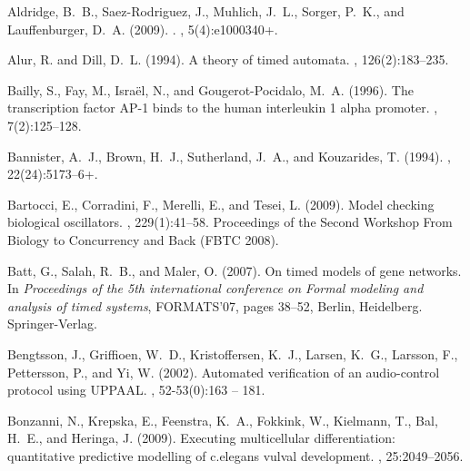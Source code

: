 \documentclass{bioinfo}
\begin{document}
% 
% 
\begin{thebibliography}{}

Aldridge, B.~B., Saez-Rodriguez, J., Muhlich, J.~L., Sorger, P.~K., and
  Lauffenburger, D.~A. (2009).
.
, 5(4):e1000340+.

Alur, R. and Dill, D.~L. (1994).
\newblock A theory of timed automata.
, 126(2):183--235.

Bailly, S., Fay, M., Isra{\"{e}}l, N., and Gougerot-Pocidalo, M.~A. (1996).
\newblock The transcription factor {AP-1} binds to the human interleukin 1
  alpha promoter.
, 7(2):125--128.

Bannister, A.~J., Brown, H.~J., Sutherland, J.~A., and Kouzarides, T. (1994).
, 22(24):5173--6+.

Bartocci, E., Corradini, F., Merelli, E., and Tesei, L. (2009).
\newblock Model checking biological oscillators.
,
  229(1):41--58.
\newblock Proceedings of the Second Workshop From Biology to Concurrency and
  Back (FBTC 2008).

Batt, G., Salah, R.~B., and Maler, O. (2007).
\newblock On timed models of gene networks.
\newblock In {\em Proceedings of the 5th international conference on Formal
  modeling and analysis of timed systems}, FORMATS'07, pages 38--52, Berlin,
  Heidelberg. Springer-Verlag.

Bengtsson, J., Griffioen, W.~D., Kristoffersen, K.~J., Larsen, K.~G., Larsson,
  F., Pettersson, P., and Yi, W. (2002).
\newblock Automated verification of an audio-control protocol using {UPPAAL}.
, 52-53(0):163 --
  181.

Bonzanni, N., Krepska, E., Feenstra, K.~A., Fokkink, W., Kielmann, T., Bal,
  H.~E., and Heringa, J. (2009).
\newblock Executing multicellular differentiation: quantitative predictive
  modelling of c.elegans vulval development.
,
  25:2049--2056.


\end{thebibliography}
\end{document}
